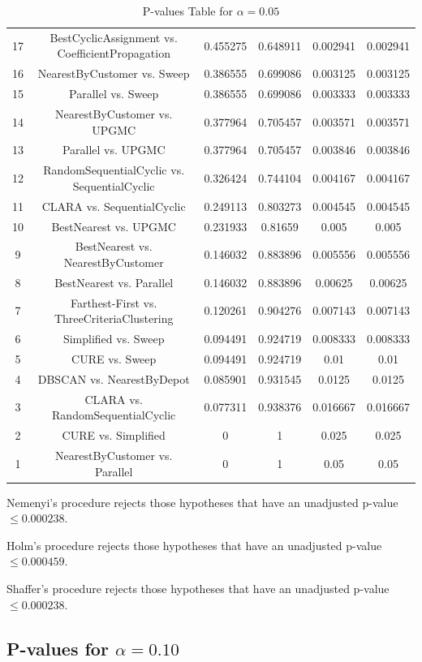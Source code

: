 \documentclass[a4paper,10pt]{article}
\begin{document}
\begin{landscape}
\begin{table}[!htp]
\begin{tabular}{cccccc}
17&BestCyclicAssignment vs. CoefficientPropagation&0.455275&0.648911&0.002941&0.002941\\
16&NearestByCustomer vs. Sweep&0.386555&0.699086&0.003125&0.003125\\
15&Parallel vs. Sweep&0.386555&0.699086&0.003333&0.003333\\
14&NearestByCustomer vs. UPGMC&0.377964&0.705457&0.003571&0.003571\\
13&Parallel vs. UPGMC&0.377964&0.705457&0.003846&0.003846\\
12&RandomSequentialCyclic vs. SequentialCyclic&0.326424&0.744104&0.004167&0.004167\\
11&CLARA vs. SequentialCyclic&0.249113&0.803273&0.004545&0.004545\\
10&BestNearest vs. UPGMC&0.231933&0.81659&0.005&0.005\\
9&BestNearest vs. NearestByCustomer&0.146032&0.883896&0.005556&0.005556\\
8&BestNearest vs. Parallel&0.146032&0.883896&0.00625&0.00625\\
7&Farthest-First vs. ThreeCriteriaClustering&0.120261&0.904276&0.007143&0.007143\\
6&Simplified vs. Sweep&0.094491&0.924719&0.008333&0.008333\\
5&CURE vs. Sweep&0.094491&0.924719&0.01&0.01\\
4&DBSCAN vs. NearestByDepot&0.085901&0.931545&0.0125&0.0125\\
3&CLARA vs. RandomSequentialCyclic&0.077311&0.938376&0.016667&0.016667\\
2&CURE vs. Simplified&0&1&0.025&0.025\\
1&NearestByCustomer vs. Parallel&0&1&0.05&0.05\\
\hline
\end{tabular}
\caption{P-values Table for $\alpha=0.05$}
\end{table}Nemenyi's procedure rejects those hypotheses that have an unadjusted p-value $\le0.000238$.

Holm's procedure rejects those hypotheses that have an unadjusted p-value $\le0.000459$.

Shaffer's procedure rejects those hypotheses that have an unadjusted p-value $\le0.000238$.

\pagebreak

\subsection{P-values for $\alpha=0.10$}


\end{landscape}
\end{document}

